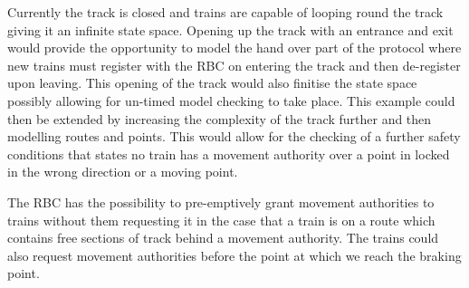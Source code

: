 Currently the track is closed and trains are capable of looping round the track giving it an infinite state space. Opening up the track with an entrance and exit would provide the opportunity to model the hand over part of the protocol where new trains must register with the RBC on entering the track and then de-register upon leaving. This opening of the track would also finitise the state space possibly allowing for un-timed model checking to take place. This example could then be extended by increasing the complexity of the track further and then modelling routes and points. This would allow for the checking of a further safety conditions that states no train has a movement authority over a point in locked in the wrong direction or a moving point.

The RBC has the possibility to pre-emptively grant movement authorities to trains without them requesting it in the case that a train is on a route which contains free sections of track behind a movement authority.  The trains could also request movement authorities before the point at which we reach the braking point.